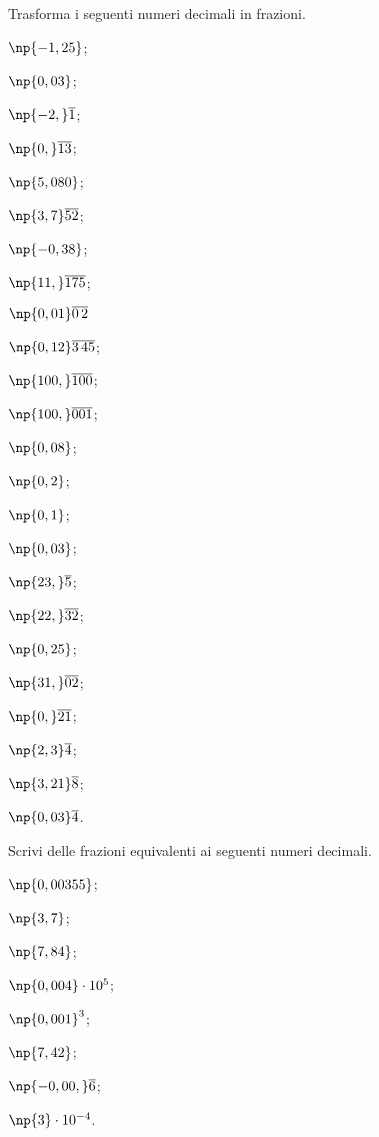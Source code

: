 \begin{esercizio}[\Ast]
\label{ese:3.28}
 Trasforma i seguenti numeri decimali in frazioni.
\begin{multicols}{4}
\begin{enumeratea}
\item $\np{-1,25}$;
\item $\np{0,03}$;
\item $\np{-2,}\overline{1}$;
\item $\np{0,}\overline{13}$;
\item $\np{5,080}$;
\item $\np{3,7}\overline{52}$;
\item $\np{-0,38}$;
\item $\np{11,}\overline{175}$;
\item $\np{0,01}\overline{0\,2}$
\item $\np{0,12}\overline{3\,45}$;
\item $\np{100,}\overline{100}$;
\item $\np{100,}\overline{001}$;
\item $\np{0,08}$;
\item $\np{0,2}$;
\item $\np{0,1}$;
\item $\np{0,03}$;
\item $\np{23,}\overline{5}$;
\item $\np{22,}\overline{32}$;
\item $\np{0,25}$;
\item $\np{31,}\overline{02}$;
\item $\np{0,}\overline{21}$;
\item $\np{2,3}\overline{4}$;
\item $\np{3,21}\overline{8}$;
\item $\np{0,03}\overline{4}$.
\end{enumeratea}
\end{multicols}
\end{esercizio}
\pagebreak
\begin{esercizio}
\label{ese:3.29}
 Scrivi delle frazioni equivalenti ai seguenti numeri decimali.
\begin{multicols}{4}
\begin{enumeratea}
\item $\np{0,00355}$;
\item $\np{3,7}$;
\item $\np{7,84}$;
\item $\np{0,004}\cdot 10^{5}$;
\item $\np{0,001}^{3}$;
\item $\np{7,42}$;
\item $\np{-0,00,}\overline{6}$;
\item $\np{3}\cdot 10^{-4}$.
\end{enumeratea}
\end{multicols}
\end{esercizio}

